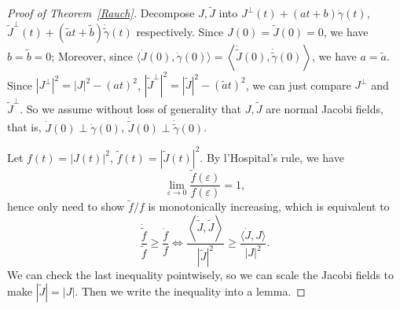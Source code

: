 \begin{proof}[Proof of Theorem~\ref{Rauch}]
    Decompose $J,\tilde{J}$ into $J^\perp(t)+(at+b)\dot{\gamma}(t)$, $\tilde{J}^\perp(t)+(\tilde{a}t+\tilde{b})\dot{\tilde{\gamma}}(t)$ respectively.
    Since $J(0)=\tilde{J}(0)=0$, we have $b=\tilde{b}=0$;
    Moreover, since $\langle\dot{J}(0),\dot{\gamma}(0)\rangle=\left\langle\dot{\tilde{J}}(0),\dot{\tilde{\gamma}}(0)\right\rangle$, we have $a=\tilde{a}$.
    Since $|J^\perp|^2=|J|^2-(at)^2$, $|\tilde{J}^\perp|^2=|\tilde{J}|^2-(\tilde{a}t)^2$,
    we can just compare $J^\perp$ and $\tilde{J}^\perp$.
    So we assume without loss of generality that $J,\tilde{J}$ are normal Jacobi fields, that is, $\dot{J}(0)\perp\dot{\gamma}(0)$, $\dot{\tilde{J}}(0)\perp\dot{\tilde{\gamma}}(0)$.

    Let $f(t)=|J(t)|^2$, $\tilde{f}(t)=|\tilde{J}(t)|^2$.
    By l'Hospital's rule, we have
    \[\lim_{\varepsilon\to 0}\frac{\tilde{f}(\varepsilon)}{f(\varepsilon)}=1,\]
    hence only need to show $\tilde{f}/f$ is monotonically increasing, which is equivalent to
    \[\frac{\dot{\tilde{f}}}{\tilde{f}}\geq\frac{\dot{f}}{f}\iff\frac{\left\langle\dot{\tilde{J}},\tilde{J}\right\rangle}{\left|\tilde{J}\right|^2}\geq\frac{\langle\dot{J},J\rangle}{|J|^2}.\]
    We can check the last inequality pointwisely, so we can scale the Jacobi fields to make $|\tilde{J}|=|J|$.
    Then we write the inequality into a lemma.
\end{proof}

